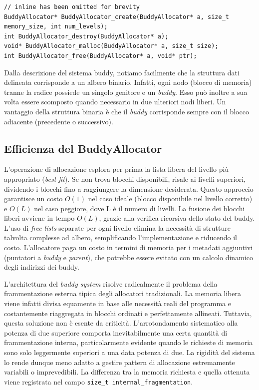 \begin{lstlisting}
// inline has been omitted for brevity
BuddyAllocator* BuddyAllocator_create(BuddyAllocator* a, size_t memory_size, int num_levels);
int BuddyAllocator_destroy(BuddyAllocator* a);
void* BuddyAllocator_malloc(BuddyAllocator* a, size_t size);
int BuddyAllocator_free(BuddyAllocator* a, void* ptr);
\end{lstlisting}

Dalla descrizione del sistema buddy, notiamo facilmente che la struttura dati delineata corrisponde a un albero binario. Infatti, ogni nodo (blocco di memoria) tranne la radice possiede un singolo genitore e un \textit{buddy}. Esso può inoltre a sua volta essere scomposto quando necessario in due ulteriori nodi liberi. Un vantaggio della struttura binaria è che il \textit{buddy} corrisponde sempre con il blocco adiacente (precedente o successivo).

\subsection*{Efficienza del BuddyAllocator}
L'operazione di allocazione esplora per prima la lista libera del livello più appropriato (\textit{best fit}). Se non trova blocchi disponibili, risale ai livelli superiori, dividendo i blocchi fino a raggiungere la dimensione desiderata. Questo approccio garantisce un costo $O(1)$ nel caso ideale (blocco disponibile nel livello corretto) e $O(L)$ nel caso peggiore, dove L è il numero di livelli. La fusione dei blocchi liberi avviene in tempo $O(L)$, grazie alla verifica ricorsiva dello stato del buddy. 
L'uso di \textit{free lists} separate per ogni livello elimina la necessità di strutture talvolta complesse ad albero, semplificando l'implementazione e riducendo il costo. L'allocatore paga un costo in termini di memoria per i metadati aggiuntivi (puntatori a \textit{buddy} e \textit{parent}), che potrebbe essere evitato con un calcolo dinamico degli indirizzi dei buddy. 

L’architettura del \textit{buddy system} risolve radicalmente il problema della frammentazione esterna tipica degli allocatori tradizionali. La memoria libera viene infatti divisa equamente in base alle necessità reali del programma e costantemente riaggregata in blocchi ordinati e perfettamente allineati. Tuttavia, questa soluzione non è esente da criticità. L'arrotondamento sistematico alla potenza di due superiore comporta inevitabilmente una certa quantità di frammentazione interna, particolarmente evidente quando le richieste di memoria sono solo leggermente superiori a una data potenza di due. La rigidità del sistema lo rende dunque meno adatto a gestire pattern di allocazione estremamente variabili o imprevedibili. La differenza tra la memoria richiesta e quella ottenuta viene registrata nel campo \lstinline|size_t internal_fragmentation|.

